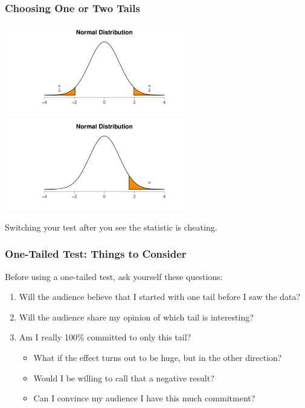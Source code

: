 \documentclass[12pt, block=fill]{beamer}
\begin{document}
\begin{frame}
  \frametitle{Choosing One or Two Tails} 


  \begin{center}
    \includegraphics[width=0.6\textwidth]{figures/normal_with_two_tails} \\
    \includegraphics[width=0.6\textwidth]{figures/normal_with_one_tail}
  \end{center}

Switching your test after you see the statistic is cheating.
\end{frame}


\begin{frame}
\frametitle{One-Tailed Test: Things to Consider}

Before using a one-tailed test, ask yourself these questions:

\begin{enumerate}
\item Will the audience believe that I started with one tail before I saw the data?
\item Will the audience share my opinion of which tail is interesting?
\item Am I really 100\% committed to only this tail?
  \begin{itemize}
  \item What if the effect turns out to be huge, but in the other direction?  
  \item Would I be willing to call that a negative result?
  \item Can I convince my audience I have this much commitment?
  \end{itemize}
\end{enumerate}
\end{frame}
\end{document}
